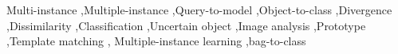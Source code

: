 \begin{keyword}

Multi-instance \sep Multiple-instance \sep Query-to-model \sep Object-to-class \sep Divergence \sep Dissimilarity \sep Classification \sep Uncertain object \sep Image analysis \sep Prototype \sep Template matching \sep
Multiple-instance learning \sep bag-to-class
\end{keyword}